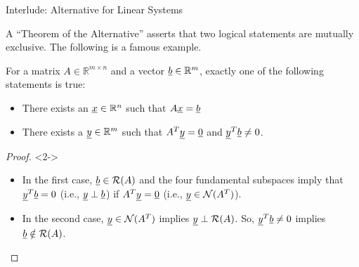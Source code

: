 \documentclass[10pt,letterpaper,english]{beamer}
\begin{document}
\begin{frame}{Interlude: Alternative for Linear Systems}

A ``Theorem of the Alternative'' asserts that two logical statements are mutually exclusive. The following is a famous example.

\begin{theorem}
For a matrix $A \in \mathbb{R}^{m\times n}$ and a vector $\underline{b}\in \mathbb{R}^m$, exactly one of the following statements is true:
\begin{itemize}
\item There exists an $\underline{x}\in \mathbb{R}^n$ such that $A\underline{x} = \underline{b}$
\item There exists a $\underline{y} \in \mathbb{R}^m$ such that $A^T \underline{y} = \underline{0}$ and $\underline{y}^T \underline{b} \neq 0$.
\end{itemize} 
\end{theorem}

\begin{proof}<2->
\begin{itemize}
\item In the first case, $\underline{b} \in \mathcal{R}(A)$ and the four fundamental subspaces imply that $\underline{y}^T \underline{b} = 0$ (i.e., $\underline{y} \perp \underline{b}$) if $A^T \underline{y} = \underline{0}$ (i.e., $\underline{y}\in \mathcal{N}(A^T)$).
\item In the second case, $\underline{y} \in \mathcal{N}(A^T)$ implies $\underline{y} \perp \mathcal{R}(A)$.
So, $\underline{y}^T \underline{b} \neq 0$ implies $\underline{b} \notin \mathcal{R}(A)$. \qedhere
\end{itemize}
\end{proof}


\end{frame}
\end{document}
